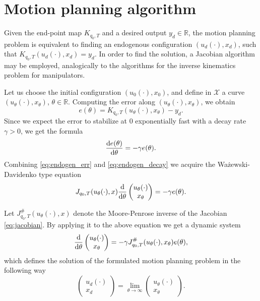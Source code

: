 \section{Motion planning algorithm}
Given the end-point map $K_{q_0, T}$ and a desired output $y_d\in\mathbb{R}$, the motion planning problem is equivalent to finding an endogenous
configuration $(u_d(\cdot), x_d)$, such that $K_{q_0, T}(u_d(\cdot), x_d)=y_d$. In order to find the
solution, a Jacobian algorithm may be employed, analogically to the algorithms
for the inverse kinematics problem for manipulators. 

Let us choose the initial configuration $(u_0(\cdot), x_0)$, and
define in $\mathcal{X}$ a curve $(u_\theta(\cdot), x_\theta)$, $\theta \in \mathbb{R}$.
Computing the error along $(u_\theta(\cdot), x_\theta)$, we obtain
\begin{equation}
\label{eq:endogen_err}
e(\theta)=K_{q_0, T}(u_\theta(\cdot), x_\theta)-y_d.
\end{equation}
Since we expect the error to stabilize at $0$ exponentially fast with a decay rate
$\gamma>0$, we get the formula
\begin{equation}
\label{eq:endogen_decay}
\frac{\mathrm{d} e(\theta)}{\mathrm{d} \theta}=-\gamma e(\theta).
\end{equation}
Combining \eqref{eq:endogen_err} and \eqref{eq:endogen_decay} we acquire the Ważewski-Davidenko type equation
\begin{equation}
J_{q_0, T}(u_\theta(\cdot), x)\dfrac{\mathrm{d}}{\mathrm{d} \theta}\begin{pmatrix}
u_\theta(\cdot)\\ x_\theta
\end{pmatrix}=-\gamma e(\theta).
\end{equation}

Let $J^\#_{q_0, T}(u_\theta(\cdot), x)$ denote the Moore-Penrose inverse \cite{ecs_ijc}
of the Jacobian \eqref{eq:jacobian}. By applying it to the above equation we get a dynamic system
\begin{equation}
\label{eq:endogen_alg}
\dfrac{\mathrm{d}}{\mathrm{d} \theta}\begin{pmatrix}
u_\theta(\cdot)\\ x_\theta
\end{pmatrix}=-\gamma J^\#_{q_0, T}(u_\theta(\cdot), x_\theta) e(\theta),
\end{equation}
which defines the solution of the formulated motion planning problem in the following way
\begin{equation}
\begin{pmatrix}
u_d(\cdot)\\ x_d
\end{pmatrix}=\lim_{\theta\rightarrow\infty}\begin{pmatrix}
u_\theta(\cdot)\\ x_\theta
\end{pmatrix}.
\end{equation}

